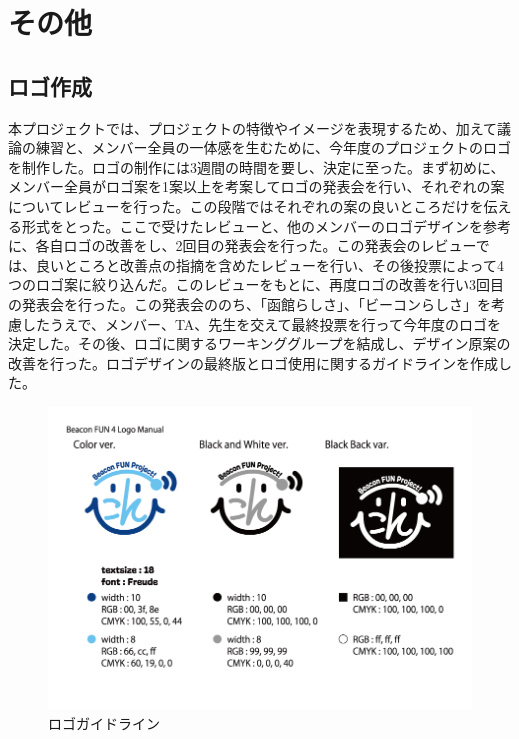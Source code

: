 \section{その他}
\subsection{ロゴ作成}
本プロジェクトでは、プロジェクトの特徴やイメージを表現するため、加えて議論の練習と、メンバー全員の一体感を生むために、今年度のプロジェクトのロゴを制作した。ロゴの制作には3週間の時間を要し、決定に至った。まず初めに、メンバー全員がロゴ案を1案以上を考案してロゴの発表会を行い、それぞれの案についてレビューを行った。この段階ではそれぞれの案の良いところだけを伝える形式をとった。ここで受けたレビューと、他のメンバーのロゴデザインを参考に、各自ロゴの改善をし、2回目の発表会を行った。この発表会のレビューでは、良いところと改善点の指摘を含めたレビューを行い、その後投票によって4つのロゴ案に絞り込んだ。このレビューをもとに、再度ロゴの改善を行い3回目の発表会を行った。この発表会ののち、「函館らしさ」、「ビーコンらしさ」を考慮したうえで、メンバー、TA、先生を交えて最終投票を行って今年度のロゴを決定した。その後、ロゴに関するワーキンググループを結成し、デザイン原案の改善を行った。ロゴデザインの最終版とロゴ使用に関するガイドラインを作成した。

\begin{figure}[htbp]
    \begin{center}
    \includegraphics[width=14cm]{images/BeaconFUN4Logo_Manual.png}
    \end{center}
    \caption{ロゴガイドライン}
    \label{fig:LogoManual}
\end{figure}

